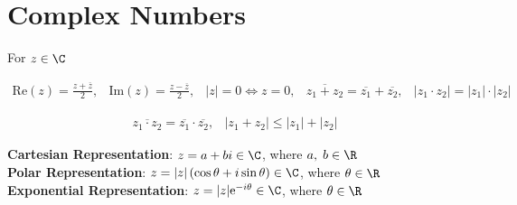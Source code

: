 \section*{Complex Numbers}

For $z\in \C$

$$\begin{matrix}
\text{Re}(z)=\frac{z+\overline{z}}{2}, & \text{Im}(z)=\frac{z-\overline{z}}{2}, & |z|=0 \Leftrightarrow z=0, & \overline{z_1+z_2}=\overline{z_1}+\overline{z_2}, & |z_1\cdot z_2|=|z_1|\cdot |z_2|
\end{matrix}$$

$$\begin{matrix}
\overline{z_1\cdot z_2}=\overline{z_1}\cdot \overline{z_2}, & |z_1+z_2| \leq |z_1|+|z_2|
\end{matrix}$$

\textbf{Cartesian Representation}: $z=a+bi\in \C$, where $a,\;b \in \R$\\

\textbf{Polar Representation}: $z=|z|\left(\cos{\theta}+i \sin{\theta}\right)\in \C$, where $\theta \in \R$\\

\textbf{Exponential Representation}: $z=|z|\text{e}^{-i\theta}\in \C$, where $\theta \in \R$
